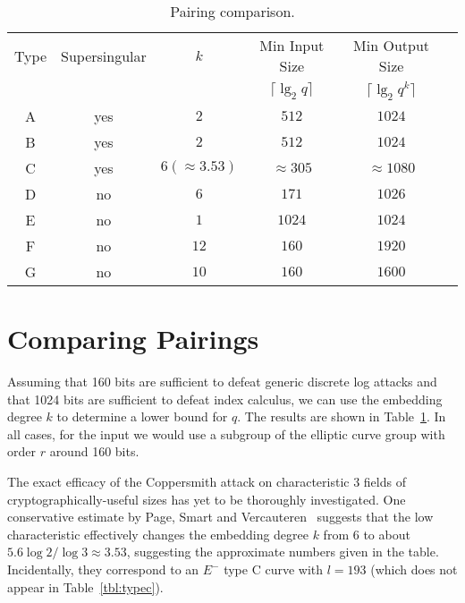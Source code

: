 \begin{table}
\begin{center}
\begin{tabular}{|c|c|c|c|c|c|}

  \hline
  Type & Supersingular & $k$ & Min Input Size & Min Output Size \\
        &     & & $\lceil \lg_2 q \rceil$ & $\lceil \lg_2 {q^k} \rceil$ \\

  \hline
  A & yes & $2$ & $512$ & $1024$ \\
  \hline
  B & yes & $2$ & $512$ & $1024$ \\
  \hline
  C & yes & $6(\approx 3.53)$ & $\approx 305$ & $\approx 1080$ \\
  \hline
  D & no & $6$ & $171$ & $1026$ \\
  \hline
  E & no & $1$ & $1024$ & $1024$ \\
  \hline
  F & no & $12$ & $160$ & $1920$ \\
  \hline
  G & no & $10$ & $160$ & $1600$ \\
  \hline
\end{tabular}
\end{center}
\caption{\label{tbl:comparepairings}
    Pairing comparison.
}
\end{table}

\section {\label{sec:comparingpairings}Comparing Pairings}

Assuming that 160 bits are sufficient to defeat generic discrete log attacks
and that 1024 bits are sufficient to defeat index calculus, we can use
the embedding degree $k$ to determine a lower bound for $q$.
The results are shown in Table~\ref{tbl:comparepairings}.
In all cases, for the input we would use a subgroup of the elliptic curve group
with order $r$ around 160 bits.

The exact efficacy of the Coppersmith attack on characteristic 3 fields
of cryptographically-useful sizes has yet to be thoroughly investigated.
One conservative estimate by Page, Smart and Vercauteren~\cite{psv}
suggests that the low characteristic
effectively changes the embedding degree $k$ from $6$ to about $5.6 \log 2 / \log 3 \approx 3.53$, suggesting the approximate numbers given in the table.
Incidentally, they correspond to an $E^-$ type C curve with $l=193$
(which does not appear
in Table~\ref{tbl:typec}).

